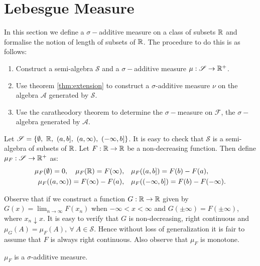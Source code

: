 \section{Lebesgue Measure}
In this section we define a $\sigma-$additive measure on a class of subsets $\mathbb{R}$ and formalise the notion of length of subsets of $\mathbb{R}$. The procedure to do this is as follows:
\begin{enumerate}
  \item Construct a semi-algebra $ \mathscr{S}$ and a $\sigma-$additive measure $\mu: \mathscr{S}\to \mathbb{R}^+$.
  \item Use theorem \cref{thm:extension} to construct a $\sigma$-additive measure $\nu$ on the algebra $ \mathscr{A}$ generated by $ \mathscr{S}$.
  \item Use the caratheodory theorem to determine the $\sigma-$measure on $ \mathscr{F}$, the $\sigma-$algebra generated by $ \mathscr{A}$.
\end{enumerate}
\begin{definition}  
Let $ \mathscr{S} = \{ \emptyset,\ \R,\ (a,b],\ (a,\infty),\ (-\infty, b]\}$. It is easy to check that $ \mathscr{S}$ is a semi-algebra of subsets of $\mathbb{R}$. Let $F:\mathbb{R}\to\mathbb{R}$ be a non-decreasing function. Then define $\mu_F: \mathscr{S}\to \mathbb{R}^+$ as:
\begin{align*}
  \mu_F(\emptyset) = 0,\quad \mu_F(\mathbb{R})=F(\infty),\quad &\mu_F((a,b]) = F(b)-F(a), \\ \mu_F((a,\infty))=F(\infty) - F(a),\quad &\mu_F((-\infty,b]) = F(b)- F(-\infty).
\end{align*}
\end{definition}
\begin{remark}
  Observe that if we construct a function $G:\mathbb{R}\to\mathbb{R}$ given by $G(x) = \lim_{n\to\infty} F(x_n)$ when $-\infty<x<\infty$ and $G(\pm \infty) = F(\pm \infty)$, where $x_n \downarrow x$. It is easy to verify that $G$ is non-decreasing, right continuous and $\mu_G(A) = \mu_F(A),\ \forall\ A \in \mathscr{S}$. Hence without loss of generalization it is fair to assume that $F$ is always right continuous. Also observe that $\mu_F$ is monotone. 
\end{remark}
\begin{proposition}
  $\mu_F$ is a $\sigma$-additive measure. 
\end{proposition}
